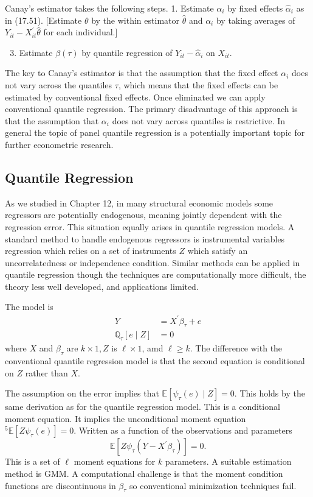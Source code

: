 \documentclass[10pt]{article}
\begin{document}
Canay's estimator takes the following steps. 1. Estimate $\alpha_{i}$ by fixed effects $\widehat{\alpha}_{i}$ as in (17.51). [Estimate $\theta$ by the within estimator $\widehat{\theta}$ and $\alpha_{i}$ by taking averages of $Y_{i t}-X_{i t}^{\prime} \widehat{\theta}$ for each individual.]

\begin{enumerate}
  \setcounter{enumi}{2}
  \item Estimate $\beta(\tau)$ by quantile regression of $Y_{i t}-\widehat{\alpha}_{i}$ on $X_{i t}$.
\end{enumerate}
The key to Canay's estimator is that the assumption that the fixed effect $\alpha_{i}$ does not vary across the quantiles $\tau$, which means that the fixed effects can be estimated by conventional fixed effects. Once eliminated we can apply conventional quantile regression. The primary disadvantage of this approach is that the assumption that $\alpha_{i}$ does not vary across quantiles is restrictive. In general the topic of panel quantile regression is a potentially important topic for further econometric research.

\subsection{Quantile Regression}
As we studied in Chapter 12, in many structural economic models some regressors are potentially endogenous, meaning jointly dependent with the regression error. This situation equally arises in quantile regression models. A standard method to handle endogenous regressors is instrumental variables regression which relies on a set of instruments $Z$ which satisfy an uncorrelatedness or independence condition. Similar methods can be applied in quantile regression though the techniques are computationally more difficult, the theory less well developed, and applications limited.

The model is
$$
\begin{aligned}
Y &=X^{\prime} \beta_{\tau}+e \\
\mathbb{Q}_{\tau}[e \mid Z] &=0
\end{aligned}
$$
where $X$ and $\beta_{\tau}$ are $k \times 1, Z$ is $\ell \times 1$, amd $\ell \geq k$. The difference with the conventional quantile regression model is that the second equation is conditional on $Z$ rather than $X$.

The assumption on the error implies that $\mathbb{E}\left[\psi_{\tau}(e) \mid Z\right]=0$. This holds by the same derivation as for the quantile regression model. This is a conditional moment equation. It implies the unconditional moment equation ${ }^{5} \mathbb{E}\left[Z \psi_{\tau}(e)\right]=0$. Written as a function of the observations and parameters
$$
\mathbb{E}\left[Z \psi_{\tau}\left(Y-X^{\prime} \beta_{\tau}\right)\right]=0 .
$$
This is a set of $\ell$ moment equations for $k$ parameters. A suitable estimation method is GMM. A computational challenge is that the moment condition functions are discontinuous in $\beta_{\tau}$ so conventional minimization techniques fail.
\end{document}
